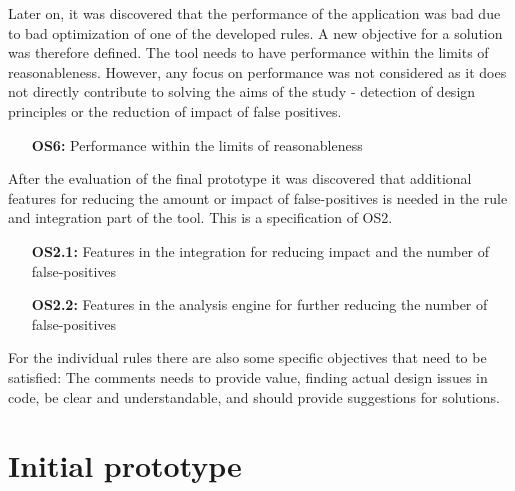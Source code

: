 \documentclass{report}
\begin{document}
Later on, it was discovered that the performance of the application was bad due to bad optimization of one of the developed rules. A new objective for a solution was therefore defined. The tool needs to have performance within the limits of reasonableness. However, any focus on performance was not considered as it does not directly contribute to solving the aims of the study - detection of design principles or the reduction of impact of false positives.
\begin{itemize}
    \item [\textbf{OS6:}] Performance within the limits of reasonableness
\end{itemize}

After the evaluation of the final prototype it was discovered that additional features for reducing the amount or impact of false-positives is needed in the rule and integration part of the tool. This is a specification of OS2. 
\begin{itemize}
    \item [\textbf{OS2.1:}] Features in the integration for reducing impact and the number of false-positives
    \item [\textbf{OS2.2:}] Features in the analysis engine for further reducing the number of false-positives  
\end{itemize}






For the individual rules there are also some specific objectives that need to be satisfied: The comments needs to provide value, finding actual design issues in code, be clear and understandable, and should provide suggestions for solutions.



\section{Initial prototype}
\end{document}
